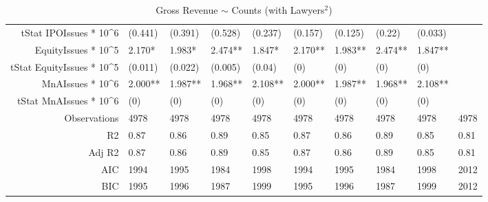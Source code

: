 \begin{table}[ht]
\begin{tabular}{rlllllllll}
  tStat IPOIssues * 10^6 & (0.441) & (0.391) & (0.528) & (0.237) & (0.157) & (0.125) & (0.22) & (0.033) &  \\ 
  EquityIssues * 10^5 & 2.170* & 1.983* & 2.474** & 1.847* & 2.170** & 1.983** & 2.474** & 1.847** &  \\ 
  tStat EquityIssues * 10^5 & (0.011) & (0.022) & (0.005) & (0.04) & (0) & (0) & (0) & (0) &  \\ 
  MnAIssues * 10^6 & 2.000** & 1.987** & 1.968** & 2.108** & 2.000** & 1.987** & 1.968** & 2.108** &  \\ 
  tStat MnAIssues * 10^6 & (0) & (0) & (0) & (0) & (0) & (0) & (0) & (0) &  \\ 
  Observations & 4978 & 4978 & 4978 & 4978 & 4978 & 4978 & 4978 & 4978 & 4978 \\ 
  R2 & 0.87 & 0.86 & 0.89 & 0.85 & 0.87 & 0.86 & 0.89 & 0.85 & 0.81 \\ 
  Adj R2 & 0.87 & 0.86 & 0.89 & 0.85 & 0.87 & 0.86 & 0.89 & 0.85 & 0.81 \\ 
  AIC & 1994 & 1995 & 1984 & 1998 & 1994 & 1995 & 1984 & 1998 & 2012 \\ 
  BIC & 1995 & 1996 & 1987 & 1999 & 1995 & 1996 & 1987 & 1999 & 2012 \\ 
   \hline
\end{tabular}
\caption{Gross Revenue $\sim$ Counts (with Lawyers$^2$)} 
\end{table}

